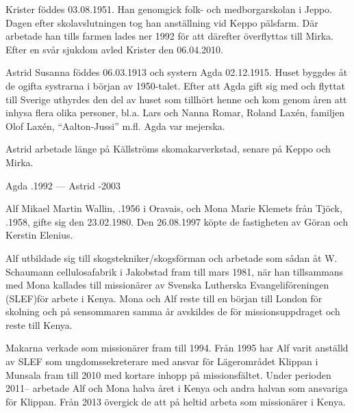 %
Krister föddes 03.08.1951. Han genomgick folk- och medborgarskolan i Jeppo. Dagen efter skolavslutningen tog han anställning vid Keppo pälsfarm. Där arbetade han tills farmen lades ner 1992 för att därefter överflyttas till Mirka. Efter en svår sjukdom avled Krister den 06.04.2010.


%
Astrid Susanna föddes 06.03.1913 och systern Agda 02.12.1915. Huset byggdes åt de ogifta systrarna i början av 1950-talet. Efter att Agda gift sig med  och flyttat till Sverige uthyrdes den del av huset som tillhört henne och kom genom åren att inhysa flera olika personer, bl.a. Lars och Nanna Romar, Roland Laxén, familjen Olof Laxén, ``Aalton-Jussi'' m.fl.
Agda var mejerska.

Astrid arbetade länge på Källströms skomakarverkstad, senare på Keppo och Mirka.
\begin{jhchildren}
  \item {}
\end{jhchildren}

Agda .1992  ---  Astrid -2003


%



%
Alf Mikael Martin Wallin, .1956 i Oravais, och Mona Marie Klemets från Tjöck, .1958, gifte sig den 23.02.1980. Den 26.08.1997 köpte de fastigheten av Göran och Kerstin Elenius.

Alf utbildade sig till skogstekniker/skogsförman och arbetade som sådan åt W. Schaumann cellulosafabrik i Jakobstad fram till mars 1981, när han tillsammans med Mona kallades till missionärer av Svenska Lutherska Evangeliföreningen (SLEF)för arbete i Kenya. Mona och Alf reste till en början till London för skolning och på sensommaren samma år avskildes de för missionsuppdraget och reste till Kenya.

Makarna verkade som missionärer fram till 1994. Från 1995 har Alf varit anställd av SLEF som ungdomssekreterare med ansvar för Lägerområdet Klippan i Munsala fram till 2010 med kortare inhopp på missionsfältet. Under perioden 2011-- arbetade Alf och Mona halva året i Kenya och andra halvan som ansvariga för Klippan. Från 2013 övergick de att på heltid arbeta som missionärer i Kenya.

